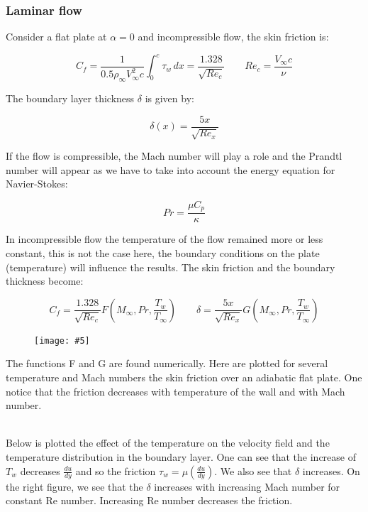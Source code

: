 \documentclass[british,french,11pt, a4paper, openany]{article}
\newcommand{\wrapfig}[6]{%
	\begin{figure}%
		\vspace{-5mm}%
		\texttt{[image: \#5]}%
		\captionof{figure}{}%
		\label{#6}%
	\end{figure}%
}
\begin{document}
\subsubsection{Laminar flow}
Consider a flat plate at $\alpha = 0$ and incompressible flow, the skin friction is: 

\begin{equation}
C_f = \frac{1}{0.5 \rho _\infty V_\infty ^2 c} \int _0^c \tau _w \,dx = \frac{1.328}{\sqrt{Re_c}} \qquad Re_c = \frac{V_\infty c}{\nu}
\end{equation}

The boundary layer thickness $\delta$ is given by:

\begin{equation}
\delta (x) = \frac{5x}{\sqrt{Re_x}}
\end{equation}

If the flow is compressible, the Mach number will play a role and the Prandtl number will appear as we have to take into account the energy equation for Navier-Stokes:

\begin{equation}
Pr = \frac{\mu C_p}{\kappa}
\end{equation}

In incompressible flow the temperature of the flow remained more or less constant, this is not the case here, the boundary conditions on the plate (temperature) will influence the results. The skin friction and the boundary thickness become: 

\begin{equation}
C_f = \frac{1.328}{\sqrt{Re_c}}F \left( M_\infty , Pr, \frac{T_w}{T_\infty} \right)\qquad \delta = \frac{5x}{\sqrt{Re_x}}G \left( M_\infty , Pr, \frac{T_w}{T_\infty} \right)
\end{equation}

\wrapfig{8}{l}{6}{0.15}{ch4/1}{ch4/1}
The functions F and G are found numerically. Here are plotted for several temperature and Mach numbers the skin friction over an adiabatic flat plate. One notice that the friction decreases with temperature of the wall and with Mach number. 

\ \\ Below is plotted the effect of the temperature on the velocity field and the temperature distribution in the boundary layer. One can see that the increase of $T_w$ decreases $\frac{du}{dy}$ and so the friction $\tau _w = \mu (\frac{du}{dy})$. We also see that $\delta$ increases. On the right figure, we see that the $\delta$ increases with increasing Mach number for constant Re number. Increasing Re number decreases the friction.  
\end{document}
